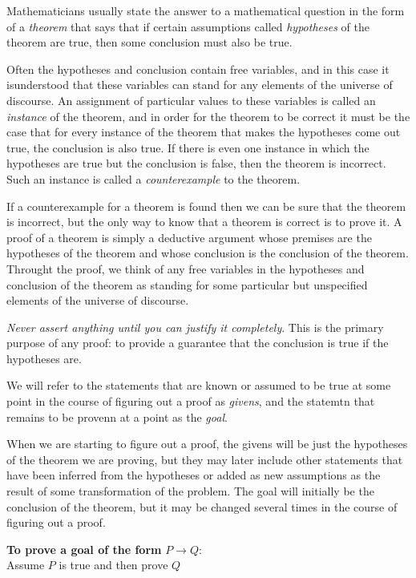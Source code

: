 Mathematicians usually state the answer to a mathematical question in the form of a \textit{theorem} that says that if certain assumptions called \textit{hypotheses} of the theorem are true, then some conclusion must also be true.

Often the hypotheses and conclusion contain free variables, and in this case it isunderstood that these variables can stand for any elements of the universe of discourse. An assignment of particular values to these variables is called an \textit{instance} of the theorem, and in order for the theorem to be correct it must be the case that for every instance of the theorem that makes the hypotheses come out true, the conclusion is also true. If there is even one instance in which the hypotheses are true but the conclusion is false, then the theorem is incorrect. Such an instance is called a \textit{counterexample} to the theorem.

If a counterexample for a theorem is found then we can be sure that the theorem is incorrect, but the only way to know that a theorem is correct is to prove it. A proof of a theorem is simply a deductive argument whose premises are the hypotheses of the theorem and whose conclusion is the conclusion of the theorem. Throught the proof, we think of any free variables in the hypotheses and conclusion of the theorem as standing for some particular but unspecified elements of the universe of discourse.

\textit{Never assert anything until you can justify it completely}. This is the primary purpose of any proof: to provide a guarantee that the conclusion is true if the hypotheses are.

We will refer to the statements that are known or assumed to be true at some point in the course of figuring out a proof as \textit{givens}, and the statemtn that remains to be provenn at a point as the \textit{goal}. 

When we are starting to figure out a proof, the givens will be just the hypotheses of the theorem we are proving, but they may later include other statements that have been inferred from the hypotheses or added as new assumptions as the result of some transformation of the problem. The goal will initially be the conclusion of the theorem, but it may be changed several times in the course of figuring out a proof.

\textbf{To prove a goal of the form} $P \rightarrow Q$:\\
Assume $P$ is true and then prove $Q$
